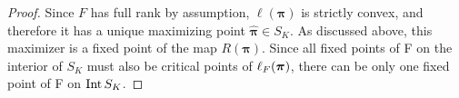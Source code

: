 \begin{proof}
Since $F$ has full rank by assumption, $\ell(\bm\pi)$ is strictly convex, and therefore it has a unique maximizing point $\hat{\bm\pi}\in S_K$.  As discussed above, this maximizer is a fixed point of the map $R(\bm\pi)$. Since all fixed points of \Rpi F on the interior of \( S_K \) must also be critical points of \( \ell_{F}({\bm\pi}) \), there can be only one fixed point of \Rpi F on \( \operatorname{Int}S_K \).

\end{proof}

